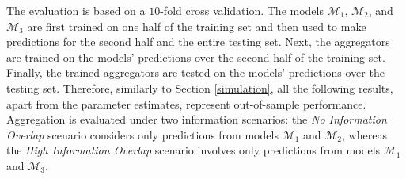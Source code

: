 \documentclass[11pt]{article}
\theoremstyle{definition}
\theoremstyle{definition}
\begin{document}
The evaluation is based on a $10$-fold cross validation. The models $\mathcal{M}_1$, $\mathcal{M}_2$, and $\mathcal{M}_3$ are first trained on one half of the training set and then used to make  predictions for the second half and the entire testing set. Next, the aggregators are  trained on the models' predictions over the second half of the training set. Finally, the trained aggregators are tested on the models' predictions over the testing set. Therefore, similarly to Section \ref{simulation}, all the following results, apart from the parameter estimates, represent out-of-sample performance. Aggregation is evaluated under two information scenarios: the \textit{No Information Overlap} scenario considers only predictions from models $\mathcal{M}_1$ and $\mathcal{M}_2$, whereas the \textit{High Information Overlap} scenario involves only predictions from models $\mathcal{M}_1$ and $\mathcal{M}_3$. 
\end{document}
